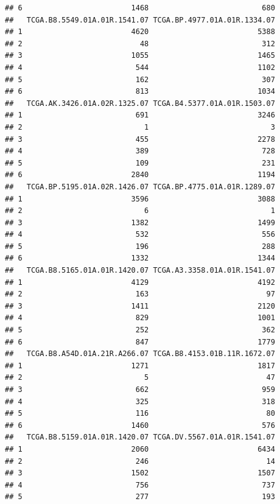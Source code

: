 \documentclass[
]{article}
\begin{document}
\begin{verbatim}
## 6                         1468                          680
##   TCGA.B8.5549.01A.01R.1541.07 TCGA.BP.4977.01A.01R.1334.07
## 1                         4620                         5388
## 2                           48                          312
## 3                         1055                         1465
## 4                          544                         1102
## 5                          162                          307
## 6                          813                         1034
##   TCGA.AK.3426.01A.02R.1325.07 TCGA.B4.5377.01A.01R.1503.07
## 1                          691                         3246
## 2                            1                            3
## 3                          455                         2278
## 4                          389                          728
## 5                          109                          231
## 6                         2840                         1194
##   TCGA.BP.5195.01A.02R.1426.07 TCGA.BP.4775.01A.01R.1289.07
## 1                         3596                         3088
## 2                            6                            1
## 3                         1382                         1499
## 4                          532                          556
## 5                          196                          288
## 6                         1332                         1344
##   TCGA.B8.5165.01A.01R.1420.07 TCGA.A3.3358.01A.01R.1541.07
## 1                         4129                         4192
## 2                          163                           97
## 3                         1411                         2120
## 4                          829                         1001
## 5                          252                          362
## 6                          847                         1779
##   TCGA.B8.A54D.01A.21R.A266.07 TCGA.B8.4153.01B.11R.1672.07
## 1                         1271                         1817
## 2                            5                           47
## 3                          662                          959
## 4                          325                          318
## 5                          116                           80
## 6                         1460                          576
##   TCGA.B8.5159.01A.01R.1420.07 TCGA.DV.5567.01A.01R.1541.07
## 1                         2060                         6434
## 2                          246                           14
## 3                         1502                         1507
## 4                          756                          737
## 5                          277                          193

\end{verbatim}
\end{document}
